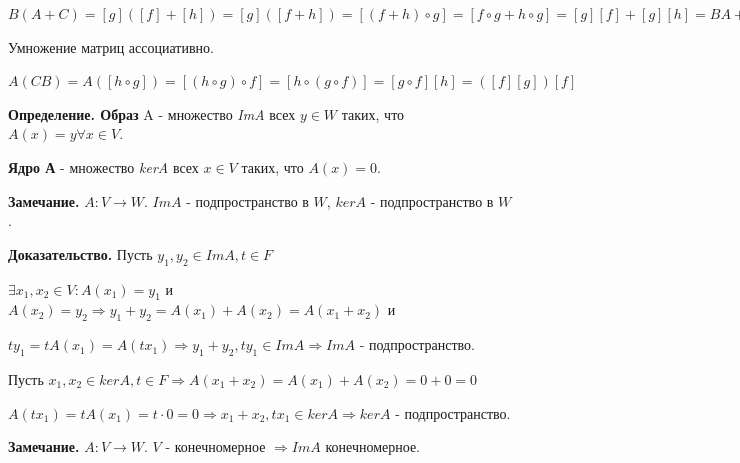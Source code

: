 \documentclass[a4paper]{article}
\begin{document}
    \begin{hproof}
        $B(A+C) = [g]([f]+[h]) = [g]([f+h]) = [(f+h) \circ g] = [f \circ g + h \circ g] = [g][f] + [g][h] = BA+BC$
    \end{hproof}


    \begin{htheorem}
        Умножение матриц ассоциативно.
    \end{htheorem}

    \begin{hproof}
        $A(CB) = A([h \circ g]) = [(h \circ g) \circ f] = [h \circ (g \circ f)] = [g \circ f][h] = ([f][g])[f]$
    \end{hproof}

    \newpage \begin{center}
                 \begin{Large}
                 \end{Large}
    \end{center}

    \textbf{Определение. Образ} A - множество \textit{ImA} всех $y \in W$ таких, что $A(x) = y \forall x \in V$.

    \textbf{Ядро А} - множество \textit{kerA} всех $x \in V$ таких, что $A(x) = 0$.

    \begin{htheorem}
        \textbf{Замечание.} $A: V \rightarrow W$. $ImA$ - подпространство в $W$, $kerA$ - подпространство в $W$.
    \end{htheorem}

    \begin{hproof}
        \textbf{Доказательство.} Пусть $y_1, y_2 \in ImA, t \in F$

        $\exists x_1, x_2 \in V: A(x_1) = y_1$ и $A(x_2) = y_2 \Rightarrow y_1+y_2 = A(x_1)+A(x_2) = A(x_1+x_2)$ и

        $ty_1 = tA(x_1) = A(tx_1) \Rightarrow y_1+y_2, ty_1 \in ImA \Rightarrow ImA$ - подпространство.

        Пусть $x_1, x_2 \in kerA, t \in F \Rightarrow A(x_1 + x_2) = A(x_1) + A(x_2) = 0+0 = 0$

        $A(tx_1) = tA(x_1) = t \cdot 0 = 0 \Rightarrow x_1 + x_2, tx_1 \in kerA \Rightarrow kerA$ - подпространство.
    \end{hproof}

    \begin{htheorem}
        \textbf{Замечание.} $A: V \rightarrow W$. $V$ - конечномерное $\Rightarrow ImA$ конечномерное.
    \end{htheorem}
\end{document}
